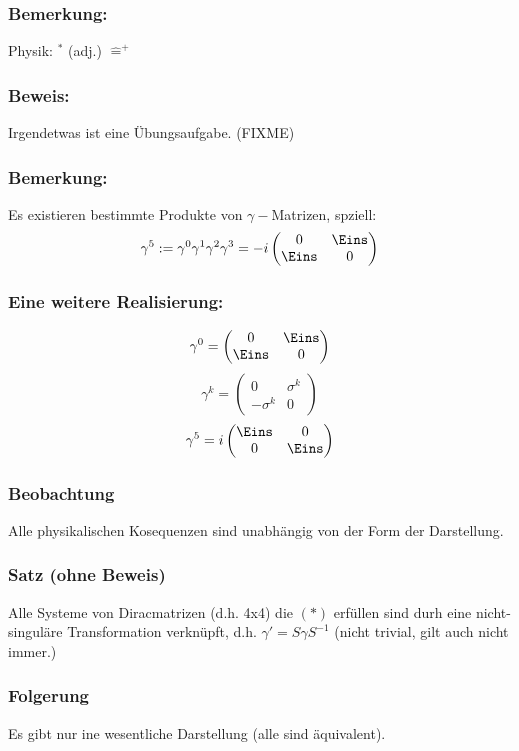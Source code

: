 \documentclass[twoside,a4paper]{scrartcl}
\renewcommand{\1}{\mathds{1}}
\newcommand{\entspricht}{\mathrel{\widehat{=}}}
\begin{document}
\subsubsection*{Bemerkung:}
Physik: $^*$ (adj.) $\entspricht ^+$
\subsubsection*{Beweis:}
Irgendetwas ist eine Übungsaufgabe. (FIXME)
\subsubsection*{Bemerkung:}
Es existieren bestimmte Produkte von $\gamma-$Matrizen, spziell:
$$\gamma^5:=\gamma^0\gamma^1\gamma^2\gamma^3=-i \begin{pmatrix} 0 & \Eins \\ \Eins & 0 \end{pmatrix}$$
\subsubsection*{Eine weitere Realisierung:}
$$\gamma^0=\begin{pmatrix} 0& \Eins \\ \Eins & 0\end{pmatrix}$$
$$\gamma^k=\begin{pmatrix} 0& \sigma^k \\ -\sigma^k & 0\end{pmatrix}$$
$$\gamma^5=i\begin{pmatrix} \Eins & 0 \\ 0 & \Eins \end{pmatrix}$$
\subsubsection*{Beobachtung}
Alle physikalischen Kosequenzen sind unabhängig von der Form der Darstellung.
\subsubsection*{Satz (ohne Beweis)}
Alle Systeme von Diracmatrizen (d.h. 4x4) die $(*)$ erfüllen sind durh eine nicht-singuläre Transformation verknüpft, d.h. $\gamma'=S\gamma S^{-1}$ (nicht trivial, gilt auch nicht immer.)
\subsubsection*{Folgerung}
Es gibt nur ine wesentliche Darstellung (alle sind äquivalent).
\end{document}

